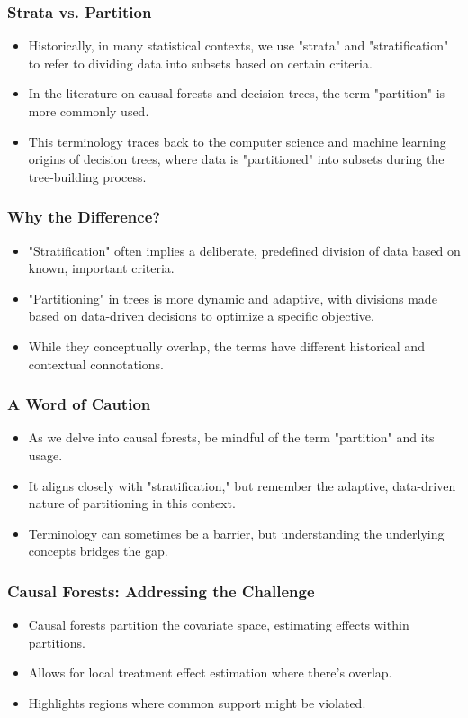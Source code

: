 \documentclass{beamer}
\begin{document}
\begin{frame}
\frametitle{Strata vs. Partition}
\begin{itemize}
    \item Historically, in many statistical contexts, we use "strata" and "stratification" to refer to dividing data into subsets based on certain criteria.
    \item In the literature on causal forests and decision trees, the term "partition" is more commonly used.
    \item This terminology traces back to the computer science and machine learning origins of decision trees, where data is "partitioned" into subsets during the tree-building process.
\end{itemize}
\end{frame}

\begin{frame}
\frametitle{Why the Difference?}
\begin{itemize}
    \item "Stratification" often implies a deliberate, predefined division of data based on known, important criteria.
    \item "Partitioning" in trees is more dynamic and adaptive, with divisions made based on data-driven decisions to optimize a specific objective.
    \item While they conceptually overlap, the terms have different historical and contextual connotations.
\end{itemize}
\end{frame}

\begin{frame}
\frametitle{A Word of Caution}
\begin{itemize}
    \item As we delve into causal forests, be mindful of the term "partition" and its usage.
    \item It aligns closely with "stratification," but remember the adaptive, data-driven nature of partitioning in this context.
    \item Terminology can sometimes be a barrier, but understanding the underlying concepts bridges the gap.
\end{itemize}
\end{frame}


\begin{frame}
\frametitle{Causal Forests: Addressing the Challenge}
\begin{itemize}
    \item Causal forests partition the covariate space, estimating effects within partitions.
    \item Allows for local treatment effect estimation where there's overlap.
    \item Highlights regions where common support might be violated.
\end{itemize}
\end{frame}
\end{document}

